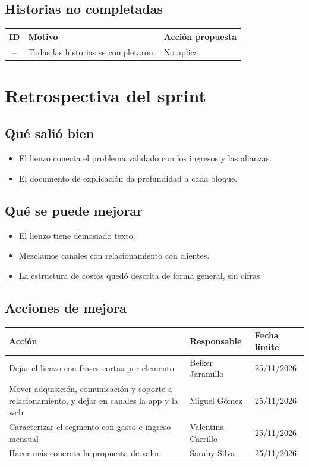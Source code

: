 \documentclass[11pt,a4paper]{article}
\begin{document}
\subsection{Historias no completadas}
\begin{tabularx}{\textwidth}{c X X}
  \toprule
  \textbf{ID} & \textbf{Motivo} & \textbf{Acción propuesta} \\
  \midrule
  -- & Todas las historias se completaron. & No aplica \\
  \bottomrule
\end{tabularx}

\section{Retrospectiva del sprint}

\subsection{Qué salió bien}
\begin{itemize}[leftmargin=1.5em]
  \item {El lienzo conecta el problema validado con los ingresos y las alianzas.}
  \item {El documento de explicación da profundidad a cada bloque.}
\end{itemize}

\subsection{Qué se puede mejorar}
\begin{itemize}[leftmargin=1.5em]
  \item {El lienzo tiene demasiado texto.}
  \item {Mezclamos canales con relacionamiento con clientes.}
  \item {La estructura de costos quedó descrita de forma general, sin cifras.}
\end{itemize}

\subsection{Acciones de mejora}
\begin{tabularx}{\textwidth}{X l l}
  \toprule
  \textbf{Acción} & \textbf{Responsable} & \textbf{Fecha límite} \\
  \midrule
  Dejar el lienzo con frases cortas por elemento & Beiker Jaramillo & 25/11/2026 \\
  Mover adquisición, comunicación y soporte a relacionamiento, y dejar en canales la app y la web & Miguel Gómez & 25/11/2026 \\
  Caracterizar el segmento con gasto e ingreso mensual & Valentina Carrillo & 25/11/2026 \\
  Hacer más concreta la propuesta de valor & Sarahy Silva & 25/11/2026 \\
  \bottomrule
\end{tabularx}
\end{document}
